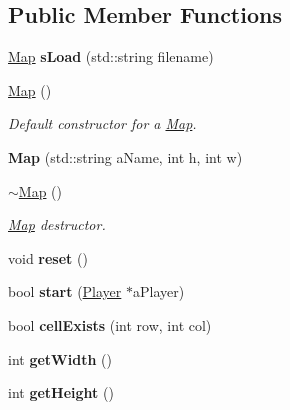 \subsection*{Public Member Functions}
\begin{DoxyCompactItemize}
\item 
\hypertarget{class_map_ab98b96f44d9fef2a266556297cee71be}{}\label{class_map_ab98b96f44d9fef2a266556297cee71be} 
\hyperlink{class_map}{Map} {\bfseries s\+Load} (std\+::string filename)
\item 
\hyperlink{class_map_a0f5ad0fd4563497b4214038cbca8b582}{Map} ()
\begin{DoxyCompactList}\small\item\em Default constructor for a \hyperlink{class_map}{Map}. \end{DoxyCompactList}\item 
\hypertarget{class_map_a2edce4c7d4627d9f0ed6ae08021590ed}{}\label{class_map_a2edce4c7d4627d9f0ed6ae08021590ed} 
{\bfseries Map} (std\+::string a\+Name, int h, int w)
\item 
\hypertarget{class_map_aa403fbe09394ccf39747588f5168e3b2}{}\label{class_map_aa403fbe09394ccf39747588f5168e3b2} 
\hyperlink{class_map_aa403fbe09394ccf39747588f5168e3b2}{$\sim$\+Map} ()
\begin{DoxyCompactList}\small\item\em \hyperlink{class_map}{Map} destructor. \end{DoxyCompactList}\item 
\hypertarget{class_map_a904c445fdce79257fedeba09070cf88a}{}\label{class_map_a904c445fdce79257fedeba09070cf88a} 
void {\bfseries reset} ()
\item 
\hypertarget{class_map_af7c347ec2e29fc7b97c81730f94176f2}{}\label{class_map_af7c347ec2e29fc7b97c81730f94176f2} 
bool {\bfseries start} (\hyperlink{class_player}{Player} $\ast$a\+Player)
\item 
\hypertarget{class_map_ab22dc646bc833bb6b4070dcc2d3bd7c0}{}\label{class_map_ab22dc646bc833bb6b4070dcc2d3bd7c0} 
bool {\bfseries cell\+Exists} (int row, int col)
\item 
\hypertarget{class_map_afd34d12227676b3cebeed9f5fae2508f}{}\label{class_map_afd34d12227676b3cebeed9f5fae2508f} 
int {\bfseries get\+Width} ()
\item 
\hypertarget{class_map_a2b09c8875af2efb711fc3a022e70427d}{}\label{class_map_a2b09c8875af2efb711fc3a022e70427d} 
int {\bfseries get\+Height} ()
\item 
\hypertarget{class_map_ac031089e3376749c6a9b97d0cce8c598}{}\label{class_map_ac031089e3376749c6a9b97d0cce8c598} 

\end{DoxyCompactItemize}
